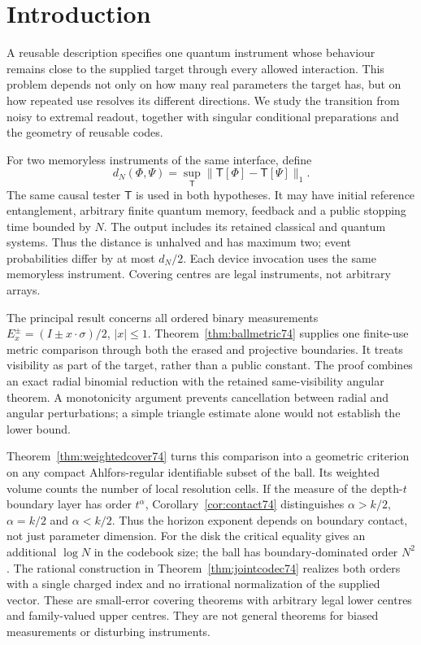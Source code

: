 \section{Introduction}
A reusable description specifies one quantum instrument whose behaviour
remains close to the supplied target through every allowed interaction.
This problem depends not only on how many real parameters the target
has, but on how repeated use resolves its different directions.
We study the transition from noisy to extremal readout, together with
singular conditional preparations and the geometry of reusable codes.

For two memoryless instruments of the same interface, define
\[
 d_N(\Phi,\Psi)=\sup_{\mathsf T}
       \|\mathsf T[\Phi]-\mathsf T[\Psi]\|_1.
\]
The same causal tester $\mathsf T$ is used in both hypotheses. It may
have initial reference entanglement, arbitrary finite quantum memory,
feedback and a public stopping time bounded by $N$. The output includes
its retained classical and quantum systems. Thus the distance is
unhalved and has maximum two; event probabilities differ by at most
$d_N/2$. Each device invocation uses the same memoryless instrument.
Covering centres are legal instruments, not arbitrary arrays.

The principal result concerns all ordered binary measurements
$E_x^\pm=(I\pm x\cdot\sigma)/2$, $|x|\le1$.
Theorem~\ref{thm:ballmetric74} supplies one finite-use metric comparison
through both the erased and projective boundaries. It treats visibility
as part of the target, rather than a public constant. The proof combines
an exact radial binomial reduction with the retained same-visibility
angular theorem. A monotonicity argument prevents cancellation between
radial and angular perturbations; a simple triangle estimate alone
would not establish the lower bound.

Theorem~\ref{thm:weightedcover74} turns this comparison into a geometric
criterion on any compact Ahlfors-regular identifiable subset of the ball.
Its weighted volume counts the number of local resolution cells. If
the measure of the depth-$t$ boundary layer has order $t^\alpha$,
Corollary~\ref{cor:contact74} distinguishes $\alpha>k/2$, $\alpha=k/2$
and $\alpha<k/2$. Thus the horizon exponent depends on boundary contact,
not just parameter dimension. For the disk the critical equality gives
an additional $\log N$ in the codebook size; the ball has boundary-dominated
order $N^2$. The rational construction in
Theorem~\ref{thm:jointcodec74} realizes both orders with a single charged
index and no irrational normalization of the supplied vector.
These are small-error covering theorems with arbitrary legal lower
centres and family-valued upper centres. They are not general theorems
for biased measurements or disturbing instruments.

